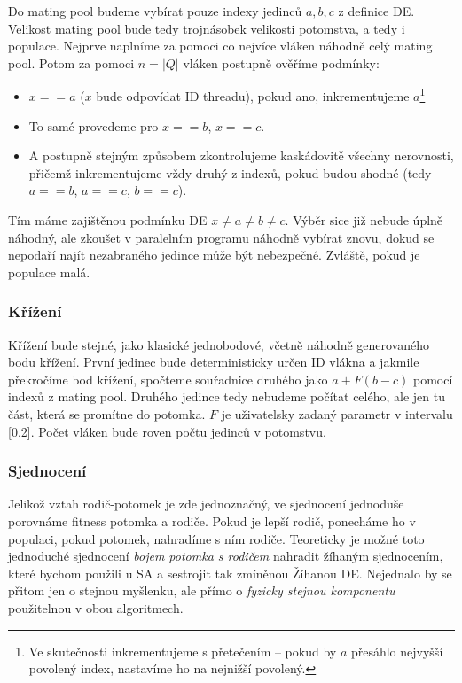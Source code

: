 Do mating pool budeme vybírat pouze indexy jedinců $a,b,c$ z definice DE. Velikost mating pool bude tedy trojnásobek velikosti potomstva, a tedy i populace. Nejprve naplníme za pomoci co nejvíce vláken náhodně celý mating pool. Potom za pomoci $n = |Q|$ vláken postupně ověříme podmínky: 
\begin{itemize}
  \item $x == a$ ($x$ bude odpovídat ID threadu), pokud ano, inkrementujeme $a$\footnote{Ve skutečnosti inkrementujeme s přetečením -- pokud by $a$ přesáhlo nejvyšší povolený index, nastavíme ho na nejnižší povolený.}
  \item To samé provedeme pro $x == b$, $x == c$.
  \item A postupně stejným způsobem zkontrolujeme kaskádovitě všechny nerovnosti, přičemž inkrementujeme vždy druhý z indexů, pokud budou shodné (tedy $a == b$, $a == c$, $b == c$).
\end{itemize}
Tím máme zajištěnou podmínku DE $x\neq a\neq b\neq c$. Výběr sice již nebude úplně náhodný, ale zkoušet v paralelním programu náhodně vybírat znovu, dokud se nepodaří najít nezabraného jedince může být nebezpečné. Zvláště, pokud je populace malá.

\subsubsection{Křížení}

Křížení bude stejné, jako klasické jednobodové, včetně náhodně generovaného bodu křížení. První jedinec bude deterministicky určen ID vlákna a jakmile překročíme bod křížení, spočteme souřadnice druhého jako $a + F(b-c)$ pomocí indexů z mating pool. Druhého jedince tedy nebudeme počítat celého, ale jen tu část, která se promítne do potomka. $F$ je uživatelsky zadaný parametr v intervalu [0,2]. Počet vláken bude roven počtu jedinců v potomstvu.

\subsubsection{Sjednocení}

Jelikož vztah rodič-potomek je zde jednoznačný, ve sjednocení jednoduše porovnáme fitness potomka a rodiče. Pokud je lepší rodič, ponecháme ho v populaci, pokud potomek, nahradíme s ním rodiče. Teoreticky je možné toto jednoduché sjednocení \emph{bojem potomka s rodičem} nahradit žíhaným sjednocením, které bychom použili u SA a sestrojit tak zmíněnou Žíhanou DE. Nejednalo by se přitom jen o stejnou myšlenku, ale přímo o \emph{fyzicky stejnou komponentu} použitelnou v obou algoritmech.



